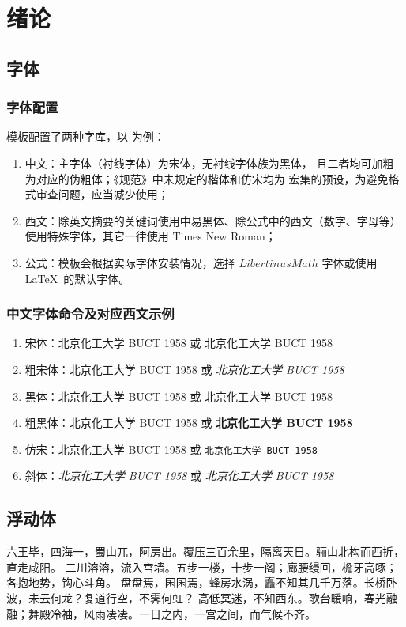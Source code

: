 \chapter{绪论}
\section{字体}
\subsection{字体配置}
模板配置了两种字库，以  为例：
\begin{enumerate}
	\item 中文：主字体（衬线字体）为宋体，无衬线字体族为黑体，%
	且二者均可加粗为对应的伪粗体；《规范》中未规定的楷体和仿宋均为  宏集的预设，为避免格式审查问题，应当减少使用；
	\item 西文：除英文摘要的关键词使用中易黑体、除公式中的西文（数字、字母等）使用特殊字体，其它一律使用 Times New Roman；
	\item 公式：模板会根据实际字体安装情况，选择 $LibertinusMath$ 字体或使用 \LaTeX\ 的默认字体。
\end{enumerate}

\subsection{中文字体命令及对应西文示例}
\begin{enumerate}
	\item 宋体：北京化工大学 BUCT 1958 或 \textrm{北京化工大学 BUCT 1958}
	\item 粗宋体：{\bfsong 北京化工大学 BUCT 1958} 或 \emph{北京化工大学 BUCT 1958}
	\item 黑体：{\heiti 北京化工大学 BUCT 1958} 或 \textsf{北京化工大学 BUCT 1958}
	\item 粗黑体：{\bfhei 北京化工大学 BUCT 1958} 或 \textsf{\bfseries 北京化工大学 BUCT 1958}
	\item 仿宋：{\ttfamily 北京化工大学 BUCT 1958} 或 \texttt{北京化工大学 BUCT 1958}
	\item 斜体：{\itshape 北京化工大学 BUCT 1958} 或 \textit{北京化工大学 BUCT 1958}
\end{enumerate}

\section{浮动体}
六王毕，四海一，蜀山兀，阿房出。覆压三百余里，隔离天日。骊山北构而西折，直走咸阳。
二川溶溶，流入宫墙。五步一楼，十步一阁；廊腰缦回，檐牙高啄；各抱地势，钩心斗角。
盘盘焉，囷囷焉，蜂房水涡，矗不知其几千万落。长桥卧波，未云何龙？复道行空，不霁何虹？
高低冥迷，不知西东。歌台暖响，春光融融；舞殿冷袖，风雨凄凄。一日之内，一宫之间，而气候不齐。


